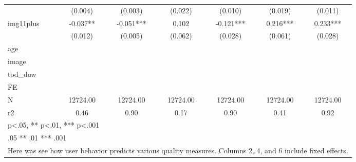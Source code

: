 {\begin{tabular}{l*{6}{c}}
            &     (0.004)   &     (0.003)   &     (0.022)   &     (0.010)   &     (0.019)   &     (0.011)   \\
[1em]
img11plus   &      -0.037** &      -0.051***&       0.102   &      -0.121***&       0.216***&       0.233***\\
            &     (0.012)   &     (0.005)   &     (0.062)   &     (0.028)   &     (0.061)   &     (0.028)   \\
\hline
age         &               &               &               &               &               &               \\
image       &               &               &               &               &               &               \\
tod\_dow     &               &               &               &               &               &               \\
FE          &               &               &               &               &               &               \\
N           &    12724.00   &    12724.00   &    12724.00   &    12724.00   &    12724.00   &    12724.00   \\
r2          &        0.46   &        0.90   &        0.17   &        0.90   &        0.41   &        0.92   \\
\hline\hline
\multicolumn{7}{l}{\footnotesize * p<.05, ** p<.01, *** p<.001}\\
\multicolumn{7}{l}{\footnotesize * .05 ** .01 *** .001}\\
\multicolumn{7}{l}{\footnotesize Here was see how user behavior predicts various quality measures. Columns 2, 4, and 6 include fixed effects.}\\
\end{tabular}
}

